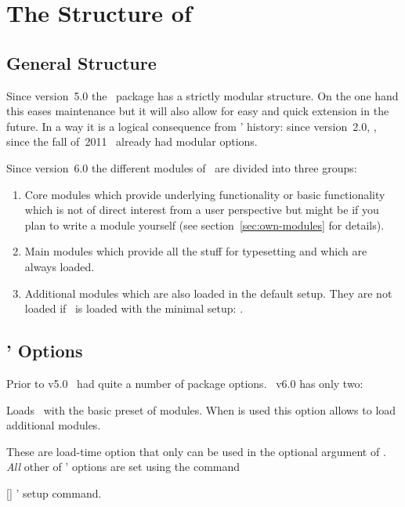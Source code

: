 \documentclass{chemmacros-manual}
\begin{document}
\section{The Structure of \chemmacros}\label{sec:structure-chemmacros}
\subsection{General Structure}
Since version~5.0 the \chemmacros\ package has a strictly modular
structure.  On the one hand this eases maintenance but it
will also allow for easy and quick extension in the future.  In a way it is a
logical consequence from \chemmacros' history: since version~2.0, \ie, since
the fall of~2011 \chemmacros\ already had modular options.

Since version~6.0 the different modules of \chemmacros\ are divided into three
groups:
\begin{enumerate}
  \item Core modules which provide underlying functionality or basic
    functionality which is not of direct interest from a user perspective but
    might be if you plan to write a module yourself (see
    section~\ref{sec:own-modules} for details).
  \item Main modules which provide all the stuff for typesetting and which are
    always loaded.
  \item Additional modules which are also loaded in the default setup. They
    are not loaded if \chemmacros\ is loaded with the minimal setup:
    .
\end{enumerate}


\subsection{\chemmacros' Options}\label{sec:using-chemm-opti}
Prior to v5.0 \chemmacros\ had quite a number of package options.
\chemmacros\ v6.0 has only two:
\begin{options}
    Loads \chemmacros\ with the basic preset of modules.
  \Default
    When  is used this option allows to load additional
    modules.
\end{options}
These are load-time option that only can be used in the optional argument of
. \emph{All} other of \chemmacros' options are set using the
command
\begin{commands}
  []
    \chemmacros' setup command.
\end{commands}
\end{document}
